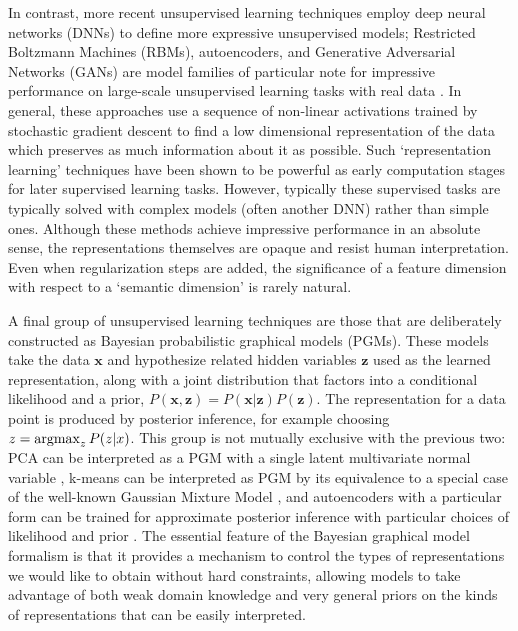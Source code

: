 In contrast, more recent unsupervised learning techniques employ deep neural networks (DNNs) to define more expressive unsupervised models; Restricted Boltzmann Machines (RBMs), autoencoders, and Generative Adversarial Networks (GANs) are model families of particular note for impressive performance on large-scale unsupervised learning tasks with real data \citep{Bengio2013,Goodfellow2014}.  In general, these approaches use a sequence of non-linear activations trained by stochastic gradient descent to find a low dimensional representation of the data which preserves as much information about it as possible. Such `representation learning' techniques have been shown to be powerful as early computation stages for later supervised learning tasks. However, typically these supervised tasks are typically solved with complex models (often another DNN) rather than simple ones. Although these methods achieve impressive performance in an absolute sense, the representations themselves are opaque and resist human interpretation. Even when regularization steps are added, the significance of a feature dimension with respect to a `semantic dimension' is rarely natural.

A final group of unsupervised learning techniques are those that are deliberately constructed as Bayesian probabilistic graphical models (PGMs). These models take the data $\textbf{x}$ and hypothesize related hidden variables $\textbf{z}$ used as the learned representation, along with a joint distribution that factors into a conditional likelihood and a prior, $P(\textbf{x}, \textbf{z}) = P(\textbf{x}|\textbf{z}) P(\textbf{z})$. The representation for a data point is produced by posterior inference, for example choosing $z = \operatorname*{argmax}_z P(z | x)$. This group is not mutually exclusive with the previous two: PCA can be interpreted as a PGM with a single latent multivariate normal variable \citep{Bishop1999}, k-means can be interpreted as PGM by its equivalence to a special case of the well-known Gaussian Mixture Model  \citep{BishopCh9}, and autoencoders with a particular form can be trained for approximate posterior inference with particular choices of likelihood and prior \citep{Kingma2014}. The essential feature of the Bayesian graphical model formalism is that it provides a mechanism to control the types of representations we would like to obtain without hard constraints, allowing models to take advantage of both weak domain knowledge and very general priors on the kinds of representations that can be easily interpreted.

